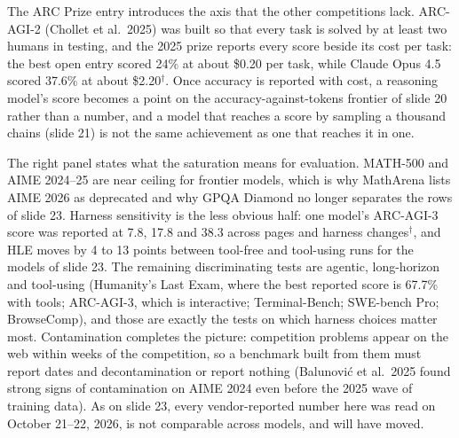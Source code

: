 \documentclass[11pt,letterpaper]{article}
\begin{document}
The ARC Prize entry introduces the axis that the other competitions lack. ARC-AGI-2 (Chollet et al.\ 2025) was built so that every task is solved by at least two humans in testing, and the 2025 prize reports every score beside its cost per task: the best open entry scored 24\% at about \$0.20 per task, while Claude Opus 4.5 scored 37.6\% at about \$2.20$^\dagger$. Once accuracy is reported with cost, a reasoning model's score becomes a point on the accuracy-against-tokens frontier of slide 20 rather than a number, and a model that reaches a score by sampling a thousand chains (slide 21) is not the same achievement as one that reaches it in one.

The right panel states what the saturation means for evaluation. MATH-500 and AIME 2024--25 are near ceiling for frontier models, which is why MathArena lists AIME 2026 as deprecated and why GPQA Diamond no longer separates the rows of slide 23. Harness sensitivity is the less obvious half: one model's ARC-AGI-3 score was reported at 7.8, 17.8 and 38.3 across pages and harness changes$^\dagger$, and HLE moves by 4 to 13 points between tool-free and tool-using runs for the models of slide 23. The remaining discriminating tests are agentic, long-horizon and tool-using (Humanity's Last Exam, where the best reported score is 67.7\% with tools; ARC-AGI-3, which is interactive; Terminal-Bench; SWE-bench Pro; BrowseComp), and those are exactly the tests on which harness choices matter most. Contamination completes the picture: competition problems appear on the web within weeks of the competition, so a benchmark built from them must report dates and decontamination or report nothing (Balunovi\'c et al.\ 2025 found strong signs of contamination on AIME 2024 even before the 2025 wave of training data). As on slide 23, every vendor-reported number here was read on October 21--22, 2026, is not comparable across models, and will have moved.
\end{document}
